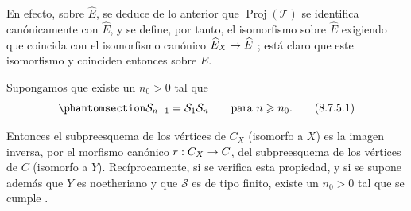 \documentclass[oneside,10pt]{amsart}
\makeatletter
\newcommand{\ega@arrow}[2]{\mathchoice{#1}{#2}{#2}{#2}}
\renewcommand{\to}{\ega@arrow{\longrightarrow}{\rightarrow}}
\let\EGAOriginalLabel\label
\renewcommand{\label}[1]{\phantomsection\EGAOriginalLabel{#1}}
\makeatother
\begin{document}
\begin{remark}[8.7.4]
\begin{enumerate}
    En efecto, sobre $\widehat{E}$, se deduce de lo anterior que $\operatorname{Proj}(\mathcal{T})$ se identifica canónicamente con $\widehat{E}$, y se define, por tanto, el isomorfismo  sobre $\widehat{E}$ exigiendo que coincida con el isomorfismo canónico $\widehat{E}_X\to\widehat{E}$ ;
    está claro que este isomorfismo y  coinciden entonces sobre $E$.
\end{enumerate}
\end{remark}
\begin{corollary}[8.7.5]
\label{II.8.7.5-fr}
Supongamos que existe un $n_0>0$ tal que
\begin{equation}
\label{II.8.7.5.1-fr}
  \mathcal{S}_{n+1}=\mathcal{S}_1\mathcal{S}_n
  \qquad\text{para }n\geqslant n_0.
\tag{8.7.5.1}
\end{equation}

Entonces el subpreesquema de los vértices de $C_X$ (isomorfo a $X$) es la imagen inversa, por el morfismo canónico $r:C_X\to C$, del subpreesquema de los vértices de $C$ (isomorfo a $Y$).
Recíprocamente, si se verifica esta propiedad, y si se supone además que $Y$ es noetheriano y que $\mathcal{S}$ es de tipo finito, existe un $n_0>0$ tal que se cumple .
\end{corollary}
\end{document}
